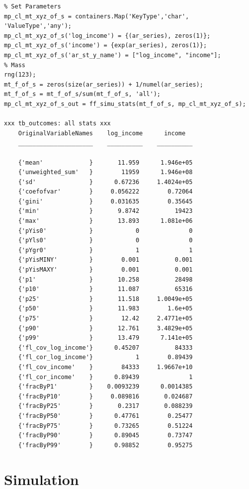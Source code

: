 \documentclass[
]{book}
\begin{document}
\begin{verbatim}
% Set Parameters
mp_cl_mt_xyz_of_s = containers.Map('KeyType','char', 'ValueType','any');
mp_cl_mt_xyz_of_s('log_income') = {(ar_series), zeros(1)};
mp_cl_mt_xyz_of_s('income') = {exp(ar_series), zeros(1)};
mp_cl_mt_xyz_of_s('ar_st_y_name') = ["log_income", "income"];
% Mass
rng(123);
mt_f_of_s = zeros(size(ar_series)) + 1/numel(ar_series);
mt_f_of_s = mt_f_of_s/sum(mt_f_of_s, 'all');
mp_cl_mt_xyz_of_s_out = ff_simu_stats(mt_f_of_s, mp_cl_mt_xyz_of_s);

xxx tb_outcomes: all stats xxx
    OriginalVariableNames    log_income      income  
    _____________________    __________    __________

    {'mean'             }       11.959      1.946e+05
    {'unweighted_sum'   }        11959      1.946e+08
    {'sd'               }      0.67236     1.4024e+05
    {'coefofvar'        }     0.056222        0.72064
    {'gini'             }     0.031635        0.35645
    {'min'              }       9.8742          19423
    {'max'              }       13.893      1.081e+06
    {'pYis0'            }            0              0
    {'pYls0'            }            0              0
    {'pYgr0'            }            1              1
    {'pYisMINY'         }        0.001          0.001
    {'pYisMAXY'         }        0.001          0.001
    {'p1'               }       10.258          28498
    {'p10'              }       11.087          65316
    {'p25'              }       11.518     1.0049e+05
    {'p50'              }       11.983        1.6e+05
    {'p75'              }        12.42     2.4771e+05
    {'p90'              }       12.761     3.4829e+05
    {'p99'              }       13.479      7.141e+05
    {'fl_cov_log_income'}      0.45207          84333
    {'fl_cor_log_income'}            1        0.89439
    {'fl_cov_income'    }        84333     1.9667e+10
    {'fl_cor_income'    }      0.89439              1
    {'fracByP1'         }    0.0093239      0.0014385
    {'fracByP10'        }     0.089816       0.024687
    {'fracByP25'        }       0.2317       0.088239
    {'fracByP50'        }      0.47761        0.25477
    {'fracByP75'        }      0.73265        0.51224
    {'fracByP90'        }      0.89045        0.73747
    {'fracByP99'        }      0.98852        0.95275
\end{verbatim}

\hypertarget{simulation}{%
\chapter{Simulation}\label{simulation}}
\end{document}
